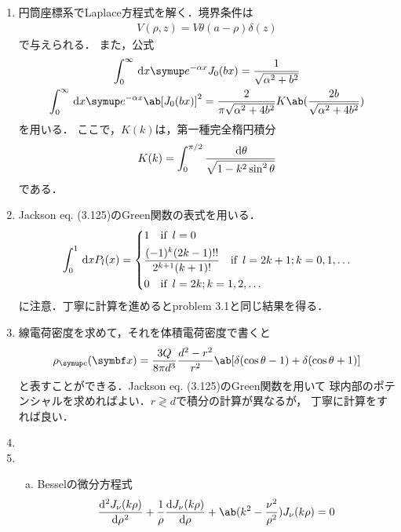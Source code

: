 \begin{enumerate}[%
  label=%
  \fbox{%
   {\thesection.\arabic*}%
    },%
    ]
  \item %
    円筒座標系でLaplace方程式を解く．境界条件は
    \begin{gather}
      V(\rho, z) = V \theta(a - \rho)\delta(z)
    \end{gather}
    で与えられる．
    また，公式
    \begin{gather}
      \int_0^\infty \dl{x} \e^{-\alpha x} J_0(bx)  = \frac{1}{\sqrt{\alpha^2 + b^2}}\\
      \int_0^\infty \dl{x} \e^{-\alpha x} \ab[J_0(bx)]^2 %
      = \frac{2}{\pi \sqrt{\alpha^2 + 4b^2}}K\ab(\frac{2b}{\sqrt{\alpha^2 + 4b^2}})
    \end{gather}
    を用いる．
    ここで，$K(k)$は，第一種完全楕円積分
    \begin{gather}
      K(k) = \int_0^{\pi/2} \frac{\dl{\theta}}{\sqrt{1-k^2\sin^2\theta}}
    \end{gather}
    である．
  \item %
    Jackson eq. (3.125)のGreen関数の表式を用いる．
    \begin{gather}
      \int_0^1 \dl{x}  P_l(x) = 
      \begin{dcases}
        1 \qqtext{if} l = 0\\
        \frac{(-1)^k(2k-1)!!}{2^{k+1}(k+1)!} \qqtext{if} l = 2k+1; k = 0, 1, \ldots\\
        0 \qqtext{if} l = 2k; k = 1, 2, \ldots
      \end{dcases}
    \end{gather}
    に注意．丁寧に計算を進めるとproblem 3.1と同じ結果を得る．
  \item %
    線電荷密度を求めて，それを体積電荷密度で書くと
    \begin{gather}
      \rho_{\mr{c}} (\bs{x}) = \frac{3Q}{8\pi d^3} \frac{d^2 - r^2}{r^2} %
      \ab[\delta(\cos\theta - 1) + \delta(\cos\theta + 1)]
    \end{gather}
    と表すことができる．Jackson eq. (3.125)のGreen関数を用いて
    球内部のポテンシャルを求めればよい．$r \gtrless d$で積分の計算が異なるが，
    丁寧に計算をすれば良い．
  \item %
  \item %
    \begin{enumerate}[(a)]
      \item
        Besselの微分方程式
        \begin{gather}
          \diff[2]{J_\nu(k\rho)}{\rho} + \frac{1}{\rho} \diff{J_\nu(k\rho)}{\rho} %
          + \ab(k^2 - \frac{\nu^2}{\rho^2})J_\nu(k\rho)  = 0

\end{gather}
\end{enumerate}
\end{enumerate}
